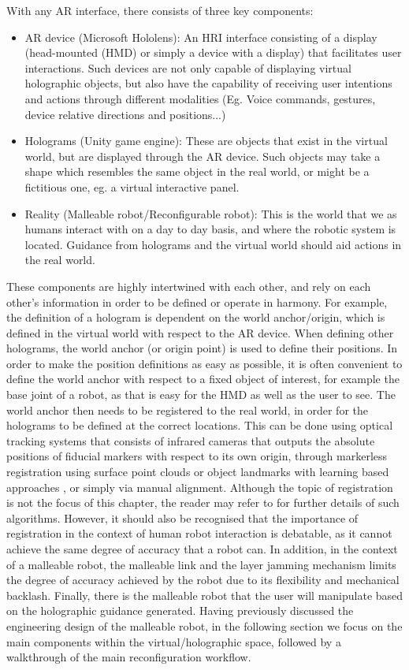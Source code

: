 With any AR interface, there consists of three key components:
\begin{itemize}
    \item AR device (Microsoft Hololens): An HRI interface consisting of a display (head-mounted (HMD) or simply a device with a display) that facilitates user interactions. Such devices are not only capable of displaying virtual holographic objects, but also have the capability of receiving user intentions and actions through different modalities (Eg. Voice commands, gestures, device relative directions and positions...)
    \item Holograms (Unity game engine): These are objects that exist in the virtual world, but are displayed through the AR device. Such objects may take a shape which resembles the same object in the real world, or might be a fictitious one, eg. a virtual interactive panel.
    \item Reality (Malleable robot/Reconfigurable robot): This is the world that we as humans interact with on a day to day basis, and where the robotic system is located. Guidance from holograms and the virtual world should aid actions in the real world.
\end{itemize}
These components are highly intertwined with each other, and rely on each other's information in order to be defined or operate in harmony. For example, the definition of a hologram is dependent on the world anchor/origin, which is defined in the virtual world with respect to the AR device. When defining other holograms, the world anchor (or origin point) is used to define their positions. In order to make the position definitions as easy as possible, it is often convenient to define the world anchor with respect to a fixed object of interest, for example the base joint of a robot, as that is easy for the HMD as well as the user to see. The world anchor then needs to be registered to the real world, in order for the holograms to be defined at the correct locations. This can be done using optical tracking systems that consists of infrared cameras that outputs the absolute positions of fiducial markers with respect to its own origin, through markerless registration using surface point clouds or object landmarks with learning based approaches \cite{hu2021markerless}, or simply via manual alignment. Although the topic of registration is not the focus of this chapter, the reader may refer to \cite{andrews2020registration, makhataeva2020augmented} for further details of such algorithms. However, it should also be recognised that the importance of registration in the context of human robot interaction is debatable, as it cannot achieve the same degree of accuracy that a robot can. In addition, in the context of a malleable robot, the malleable link and the layer jamming mechanism limits the degree of accuracy achieved by the robot due to its flexibility and mechanical backlash.  Finally, there is the malleable robot that the user will manipulate based on the holographic guidance generated.
Having previously discussed the engineering design of the malleable robot, in the following section we focus on the main components within the virtual/holographic space, followed by a walkthrough of the main reconfiguration workflow.

